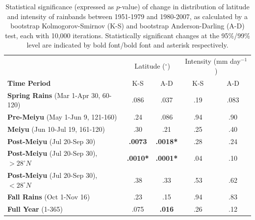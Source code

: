 \documentclass[singlecolumn,11pt]{pnas-new}
\begin{document}
\begin{table}[p]

\centering

\caption{Statistical significance (expressed as $p$-value) of change in distribution of latitude and intensity of rainbands between 1951-1979 and 1980-2007, as calculated by a bootstrap Kolmogorov-Smirnov (K-S) and bootstrap Anderson-Darling (A-D) test, each with 10,000 iterations. Statistically significant changes at the 95\%/99\% level are indicated by bold font/bold font and asterisk respectively.}

\begin{tabular}{ l c c c c}
												& \multicolumn{2}{c}{Latitude ($^\circ$)} & \multicolumn{2}{c}{Intensity  (mm day$^{-1}$)} \\
	 \textbf{Time Period} 							& K-S 			& A-D 			& K-S 	& A-D \\
	 \hline
	\textbf{Spring Rains} (Mar 1-Apr 30, 60-120)  		& .086			& .037			& .19	& .083 \\
	\textbf{Pre-Meiyu} (May 1-Jun 9, 121-160)  		& .24 			&  .086 			& .94	& .90 \\
	\textbf{Meiyu} (Jun 10-Jul 19, 161-120)			& .30			&  .21			&  .25	& .40 \\	
	\textbf{Post-Meiyu} (Jul 20-Sep 30) 				& \textbf{.0073}	&  \textbf{.0018*}  	&  .28 	& .24 \\
	\textbf{Post-Meiyu} (Jul 20-Sep 30), $>28^{\circ}N$   & \textbf{.0010*}	&  \textbf{.0001*} 	&  .04 	& .10 \\	
	\textbf{Post-Meiyu} (Jul 20-Sep 30), $<28^{\circ}N$   & .38			&  .33			&  .53	& .62 \\	
	\textbf{Fall Rains} (Oct 1-Nov 16) 					& .23 			&  .15			&  .94 	& .83 \\	
	\textbf{Full Year} (1-365)						& .075			&  \textbf{.016} 	&  .26 	& .12 \\	
	
\end{tabular}
\label{tab:s1}
\end{table}
\end{document}
